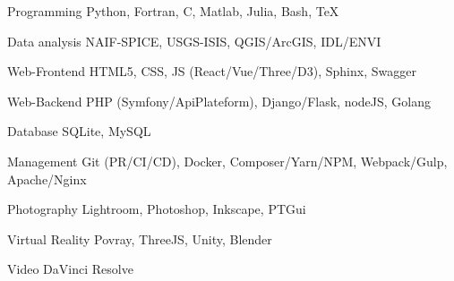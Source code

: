 
\begin{cvskills}

	\cvskill
	{Programming}
    {Python, Fortran, C, Matlab, Julia, Bash, \TeX}

	\cvskill
	{Data analysis}
    {NAIF-SPICE, USGS-ISIS, QGIS/ArcGIS, IDL/ENVI}

	\cvskill
    {Web-Frontend}
    {HTML5, CSS, JS (React/Vue/Three/D3), Sphinx, Swagger}

    \cvskill
    {Web-Backend}
    {PHP (Symfony/ApiPlateform), Django/Flask, nodeJS, Golang}

	\cvskill
    {Database}
    {SQLite, MySQL}

	\cvskill
    {Management}
    {Git (PR/CI/CD), Docker, Composer/Yarn/NPM, Webpack/Gulp, Apache/Nginx}

	\cvskill
    {Photography}
    {Lightroom, Photoshop, Inkscape, PTGui}

    \cvskill
    {Virtual Reality}
    {Povray, ThreeJS, Unity, Blender}

    \cvskill
    {Video}
    {DaVinci Resolve}

\end{cvskills}
